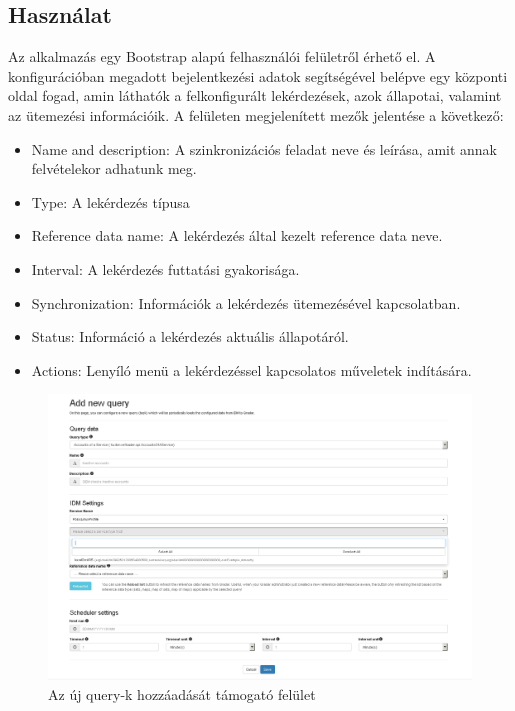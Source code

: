 \subsection{Használat}

Az alkalmazás egy Bootstrap alapú felhasználói felületről érhető el. A konfigurációban megadott bejelentkezési adatok segítségével belépve egy központi oldal fogad, amin láthatók a felkonfigurált lekérdezések, azok állapotai, valamint az ütemezési információik. A felületen megjelenített mezők jelentése a következő:



\begin{itemize}
	\item Name and description: A szinkronizációs feladat neve és leírása, amit annak felvételekor adhatunk meg.
	\item Type: A lekérdezés típusa
	\item Reference data name: A lekérdezés által kezelt reference data neve.
	\item Interval: A lekérdezés futtatási gyakorisága.
	\item Synchronization: Információk a lekérdezés ütemezésével kapcsolatban.
	\item Status: Információ a lekérdezés aktuális állapotáról.
	\item Actions: Lenyíló menü a lekérdezéssel kapcsolatos műveletek indítására.
\end{itemize}
\begin{figure}[!h]
	\centering
	\includegraphics[width=0.8\linewidth]{figures/refloader_ui/add_new2}
	\caption{Az új query-k hozzáadását támogató felület}
	\label{fig:addnew}
\end{figure}

